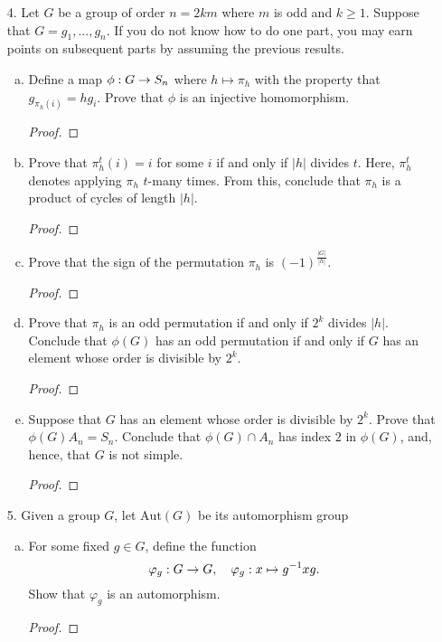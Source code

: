 \begin{itemize}
\item[4.] Let $G$ be a group of order $n = 2km$ where $m$ is odd and $k \geq 1$. Suppose that $G = {g_1, ..., g_n}$. If you do not know how to do one part, you may earn points on subsequent parts by assuming the previous results.
\begin{enumerate}[(a)]
    \item Define a map $\phi : G \rightarrow S_n$ where $h \mapsto \pi_h$ with the property that $g_{\pi_h(i)} = hg_i$. Prove that $\phi$ is an injective homomorphism.
    \begin{proof}

    \end{proof}

    \item Prove that $\pi^t_{h}(i) = i$ for some $i$ if and only if $|h|$ divides $t$. Here, $\pi^t_{h}$ denotes applying $\pi_{h}$ $t$-many times. From this, conclude that $\pi_{h}$ is a product of cycles of length $|h|$.
    \begin{proof}

    \end{proof}

    \item Prove that the sign of the permutation $\pi_{h}$ is $(-1)^{\frac{|G|}{|h|}}$.
    \begin{proof}

    \end{proof}

    \item Prove that $\pi_{h}$ is an odd permutation if and only if $2^k$ divides $|h|$. Conclude that $\phi(G)$ has an odd permutation if and only if $G$ has an element whose order is divisible by $2^k$.
    \begin{proof}

    \end{proof}

    \item Suppose that $G$ has an element whose order is divisible by $2^k$. Prove that $\phi(G)A_n = S_n$. Conclude that $\phi(G) \cap A_n$ has index $2$ in $\phi(G)$, and, hence, that $G$ is not simple.
    \begin{proof}

    \end{proof}
\end{enumerate}





\item[5.] Given a group $G$, let $\text{Aut}(G)$ be its automorphism group
\begin{enumerate}[(a)]
    \item For some fixed $g \in G$, define the function $$\varphi_g : G \rar G, \ \ \  \varphi_g : x \mapsto g^{-1}xg.$$ Show that $\varphi_g$ is an automorphism.
    \begin{proof}


\end{proof}
\end{enumerate}
\end{itemize}
